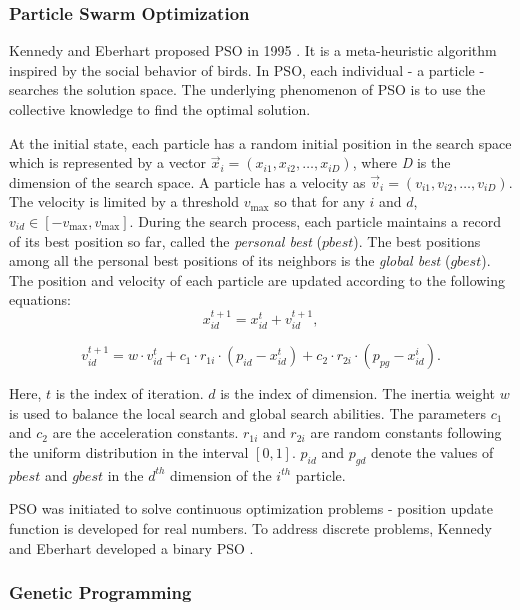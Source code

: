 \subsubsection{Particle Swarm Optimization}
Kennedy and Eberhart proposed PSO in 1995 \cite{Eberhart:1995tj}. It is a meta-heuristic algorithm inspired by the social behavior of birds. In PSO, each individual - a particle - searches the solution space. The underlying phenomenon of PSO is to use the collective knowledge to find the optimal solution.

At the initial state, each particle has a random initial position in the search space which is represented by a vector $\vec{x}_i = (x_{i1}, x_{i2}, \dots, x_{iD})$, where \emph{D} is the dimension of the search space. A particle has a velocity as $\vec{v}_i = (v_{i1}, v_{i2}, \dots, v_{iD})$. The velocity is limited by a threshold $v_{\max}$ so that for any $i$ and $d$, $v_{id} \in [-v_{\max}, v_{\max}]$. During the search process, each particle maintains a record of its best position so far, called the \emph{personal best} ($pbest$). The best positions among all the personal best positions of its neighbors is the \emph{global best} ($gbest$). The position and velocity of each particle are updated according to the following equations:
\begin{equation}
\label{eq:updatePosition}
x^{t+1}_{id} = x^{t}_{id} + v^{t+1}_{id},
\end{equation}

\begin{equation}
\label{eq:updateVelocity}
v^{t+1}_{id} = w \cdot v^{t}_{id} + c_1 \cdot r_{1i} \cdot (p_{id} - x^t_{id}) + c_2 \cdot r_{2i} \cdot (p_{pg} - x^i_{id}).
\end{equation}

Here, $t$ is the index of iteration. $d$ is the index of dimension. The inertia weight $w$ is used to balance the local search and global search abilities. The parameters $c_1$ and $c_2$ are the acceleration constants. $r_{1i}$ and $r_{2i}$ are random constants following the uniform distribution in the interval $[0, 1]$. $p_{id}$ and $p_{gd}$ denote the values of $pbest$ and $gbest$ in the $d^{th}$ dimension of the $i^{th}$ particle.

PSO was initiated to solve continuous optimization problems - position update function is developed for real numbers. To address discrete problems, Kennedy and Eberhart developed a binary PSO \cite{Kennedy:1997hd}. 

\subsubsection{Genetic Programming}

